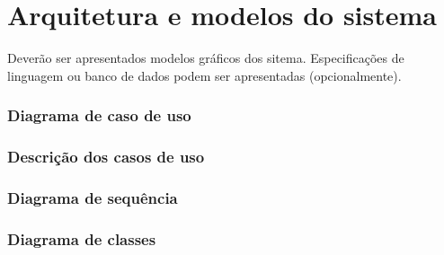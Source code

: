 \chapter{Arquitetura e modelos do sistema}

Dever\~ao ser apresentados modelos gr\'aficos dos sitema. Especificaç\~oes de linguagem ou banco de dados podem ser apresentadas (opcionalmente).

\subsection{Diagrama de caso de uso}


\subsection{Descriç\~ao dos casos de uso}

\subsection{Diagrama de sequ\^encia}

\subsection{Diagrama de classes}

